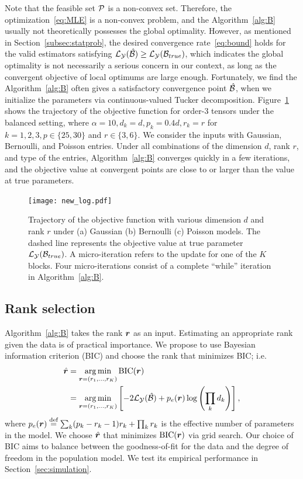 \documentclass[12pt]{article}
\theoremstyle{plain}
\theoremstyle{definition}
\begin{document}
Note that the feasible set $\mathcal{P}$ is a non-convex set. Therefore, the optimization~\eqref{eq:MLE} is a non-convex problem, and the Algorithm~\ref{alg:B} usually not theoretically possesses the global optimality. However, as mentioned in Section~\ref{subsec:statprob}, the desired convergence rate~\eqref{eq:bound} holds for the valid estimators satisfying $\mathcal{L}_{\mathcal{Y}} (\hat {\mathcal{B}}) \geq \mathcal{L}_{\mathcal{Y}} (\mathcal{B}_{true})$, which indicates the global optimality is not necessarily a serious concern in our context, as long as the convergent objective of local optimums are large enough. Fortunately, we find the  Algorithm~\ref{alg:B}  often gives a satisfactory convergence point $\hat {\mathcal{B}}$, when we initialize the parameters via continuous-valued Tucker decomposition. Figure~\ref{fig:loglike} shows the trajectory of the objective function for order-3 tensors under the balanced setting, where $\alpha = 10, d_k = d, p_k = 0.4d, r_k = r$ for $ k = 1,2,3, p \in \{25,30\}$  and $r \in \{3, 6\}$. We consider the inputs with Gaussian, Bernoulli, and Poisson entries. Under all combinations of the dimension $d$, rank $r$, and type of the entries, Algorithm~\ref{alg:B} converges quickly in a few iterations, and the objective value at convergent points are close to or larger than the value at true parameters.  


\begin{figure}[t]
\centering
\texttt{[image: new\_log.pdf]}
\caption{Trajectory of the objective function with various dimension $d$ and rank $r$ under (a) Gaussian (b) Bernoulli (c) Poisson models. The dashed line represents the objective value at true parameter $\mathcal{L}_{\mathcal{Y}}(\mathcal{B}_{true})$. A micro-iteration refers to the update for one of the $K$ blocks. Four micro-iterations consist of a complete ``while'' iteration in Algorithm~\ref{alg:B}.}\label{fig:loglike}
\end{figure}



\subsection{Rank selection}\label{sec:tuning}
Algorithm~\ref{alg:B} takes the rank $\bm{r}$ as an input. Estimating an appropriate rank given the data is of practical importance. We propose to use Bayesian information criterion (BIC) and choose the rank that minimizes BIC; i.e.
\begin{align}\label{eq:BIC}
\hat {\bm{r}}&=\operatorname*{arg\,min}_{\bm{r}=(r_1,\ldots,r_K)} \text{BIC}(\bm{r})\\
&=\operatorname*{arg\,min}_{\bm{r}=(r_1,\ldots,r_K)}\left[-2\mathcal{L}_{\mathcal{Y}}(\hat {\mathcal{B}})+p_e(\bm{r})\log \left(\prod_k d_k\right) \right],
\end{align}
where $p_e(\bm{r})\stackrel{\text{def}}{=}\sum_k (p_k-r_k-1)r_k+\prod_k r_k$ is the effective number of parameters in the model. We choose $\hat {\bm{r}}$ that minimizes $\text{BIC}(\bm{r})$ via grid search. Our choice of BIC aims to balance between the goodness-of-fit for the data and the degree of freedom in the population model. We test its empirical performance in Section~\ref{sec:simulation}.  
\end{document}
